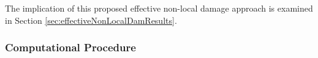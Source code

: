 \documentclass[sn-mathphys,Numbered]{sn-jnl}%
\newcommand{\bb}{\boldsymbol}
\begin{document}
The implication of this proposed effective non-local damage approach is examined in Section \ref{sec:effectiveNonLocalDamResults}.




\subsubsection{Computational Procedure} \label{sec:lemaitre_comp_proc}
\end{document}
